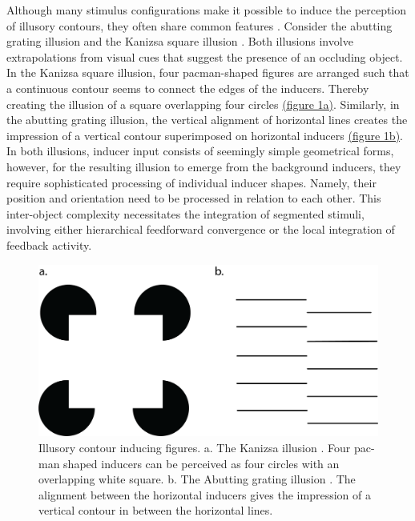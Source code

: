 \documentclass[12pt]{article}
\begin{document}
Although many stimulus configurations make it possible to induce the perception of illusory contours, they often share common features \autocite{palmerLateInfluencesPerceptual2000}. Consider the abutting grating illusion \autocite{sorianoAbuttingGratingIllusion1996} and the Kanizsa square illusion \autocite{kanizsaSubjectiveContours1976}. Both illusions involve extrapolations from visual cues that suggest the presence of an occluding object. In the Kanizsa square illusion, four pacman-shaped figures are arranged such that a continuous contour seems to connect the edges of the inducers. Thereby creating the illusion of a square overlapping four circles \hyperref[fig:figure_1]{(figure 1a)}. Similarly, in the abutting grating illusion, the vertical alignment of horizontal lines creates the impression of a vertical contour superimposed on horizontal inducers \hyperref[fig:figure_1]{(figure 1b)}. In both illusions, inducer input consists of seemingly simple geometrical forms, however, for the resulting illusion to emerge from the background inducers, they require sophisticated processing of individual inducer shapes. Namely, their position and orientation need to be processed in relation to each other. This inter-object complexity necessitates the integration of segmented stimuli, involving either hierarchical feedforward convergence or the local integration of feedback activity. 

\begin{figure}[H]
  \centering
  \includegraphics[width=1.0\textwidth]{adjusted_figures/illusory_figures_kanizsa_grating.png}
  \caption{Illusory contour inducing figures. a. The Kanizsa illusion \autocite{kanizsaSubjectiveContours1976}. Four pac-man shaped inducers can be perceived as four circles with an overlapping white square. b. The Abutting grating illusion \autocite{sorianoAbuttingGratingIllusion1996}. The alignment between the horizontal inducers gives the impression of a vertical contour in between the horizontal lines.}
  \label{fig:figure_1}
\end{figure}
\end{document}
